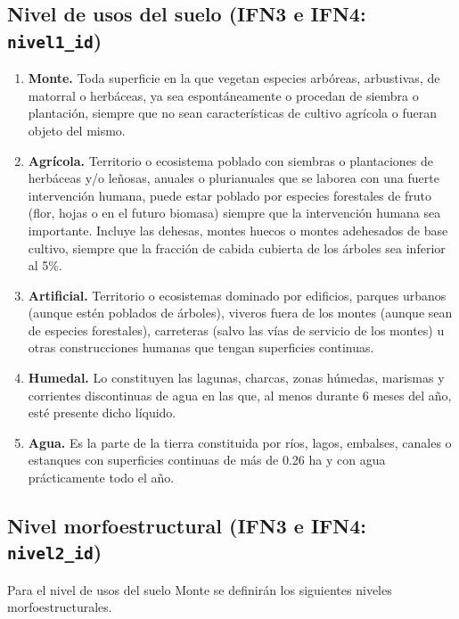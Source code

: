 \subsection{Nivel de usos del suelo  (IFN3 e IFN4: \texttt{nivel1\_id})}\label{sec:nivel1}

\begin{enumerate}
    \item \textbf{Monte.} Toda superficie en la que vegetan especies arbóreas, arbustivas, de matorral o herbáceas, ya sea espontáneamente o procedan de siembra o plantación, siempre que no sean características de cultivo agrícola o fueran objeto del mismo.
    \item \textbf{Agrícola.} Territorio o ecosistema poblado con siembras o plantaciones de herbáceas y/o leñosas, anuales o plurianuales que se laborea con una fuerte intervención humana, puede estar poblado por especies forestales de fruto (flor, hojas o en el futuro biomasa) siempre que la intervención humana sea importante. Incluye las dehesas, montes huecos o montes adehesados de base cultivo, siempre que la fracción de cabida cubierta de los árboles sea inferior al 5\%.
    \item \textbf{Artificial.} Territorio o ecosistemas dominado por edificios, parques urbanos (aunque estén poblados de árboles), viveros fuera de los montes (aunque sean de especies forestales), carreteras (salvo las vías de servicio de los montes) u otras construcciones humanas que tengan superficies continuas.
    \item \textbf{Humedal.} Lo constituyen las lagunas, charcas, zonas húmedas, marismas y corrientes discontinuas de agua en las que, al menos durante 6 meses del año, esté presente dicho líquido.
    \item \textbf{Agua.} Es la parte de la tierra constituida por ríos, lagos, embalses, canales o estanques con superficies continuas de más de 0.26 ha y con agua prácticamente todo el año.
\end{enumerate}


\subsection{Nivel morfoestructural  (IFN3 e IFN4: \texttt{nivel2\_id})}\label{sec:nivel2}
Para el nivel de usos del suelo Monte se definirán los siguientes niveles morfoestructurales.

